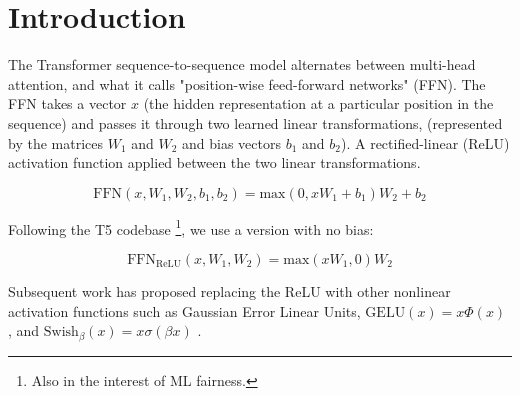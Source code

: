 \documentclass{article}
\title{\vspace{-2em}%
  \hrule height 4pt%
  \vskip 0.25in%
  \vskip -\parskip%
  \textbf{
  GLU Variants Improve Transformer 
  }%
  \vskip 0.2in%
  \vskip -\parskip%
  \hrule height 1pt%
  \vskip 0.09in}
\author{Noam Shazeer \\ Google \\ noam@google.com}
\begin{document}
\maketitle




\begin{abstract}
Gated Linear Units \citep{dauphin2016} consist of the component-wise product of two linear projections, one of which is first passed through a sigmoid function.  Variations on GLU are possible, using different nonlinear (or even linear) functions in place of sigmoid.  We test these variants in the feed-forward sublayers of the Transformer \citep{Vas17} sequence-to-sequence model, and find that some of them yield quality improvements over the typically-used ReLU or GELU activations.
\end{abstract}


\section{Introduction}
The Transformer \citep{Vas17} sequence-to-sequence model alternates between multi-head attention, and what it calls "position-wise feed-forward networks" (FFN).  The FFN takes a vector $x$ (the hidden representation at a particular position in the sequence) and passes it through two learned linear transformations, (represented by the matrices $W_1$ and $W_2$ and bias vectors $b_1$ and $b_2$).  A rectified-linear (ReLU) \citep{glorot2011deep} activation function applied between the two linear transformations.

\begin{equation}
\textrm{FFN}(x, W_1, W_2, b_1, b_2) = \textrm{max}(0, xW_1 + b_1)W_2 + b_2
\end{equation}

Following the T5 codebase \citep{raffel2019exploring} \footnote{Also in the interest of ML fairness.}, we use a version with no bias:

\begin{equation}
\textrm{FFN}_\textrm{ReLU}(x, W_1, W_2) = \textrm{max}(xW_1, 0)W_2
\end{equation}

Subsequent work has proposed replacing the ReLU with other nonlinear activation functions such as Gaussian Error Linear Units, $\textrm{GELU}(x)=x\Phi(x)$ \citep{hendrycks2016}, and $\textrm{Swish}_\beta(x)=x\sigma(\beta x)$ \citep{ramachandran2017searching}.
\end{document}
